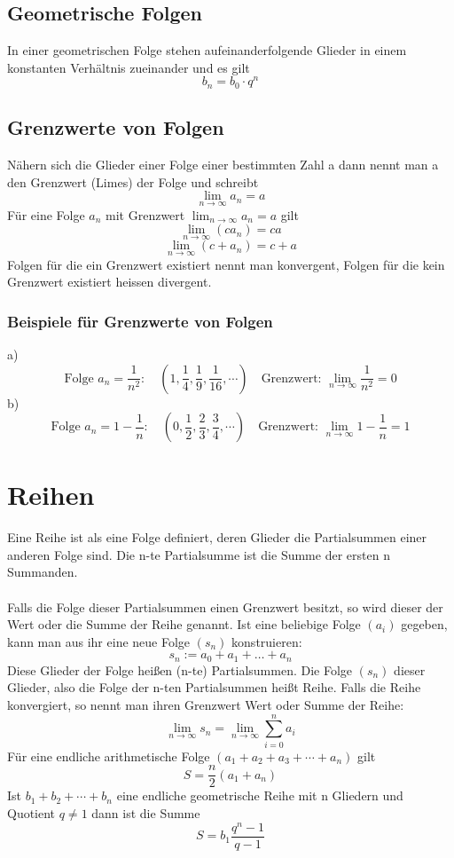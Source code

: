 \documentclass[a4paper]{article}
\begin{document}
\subsection{Geometrische Folgen}
In einer geometrischen Folge stehen aufeinanderfolgende Glieder in einem konstanten Verhältnis zueinander und es gilt
\[ b_n=b_0 \cdot q^n \]

\subsection{Grenzwerte von Folgen}
Nähern sich die Glieder einer Folge einer bestimmten Zahl a dann nennt man a den Grenzwert (Limes) der Folge und schreibt
\[ \lim_{n \to \infty} a_n=a \]
Für eine Folge  $a_n$ mit Grenzwert $\lim_{n \to \infty} a_n=a$ gilt
\[ \lim_{n \to \infty} (ca_n)=ca \]
\[ \lim_{n \to \infty} (c+a_n)=c+a \]
Folgen für die ein Grenzwert existiert nennt man konvergent, Folgen für die kein Grenzwert existiert heissen divergent.

\subsubsection{Beispiele für Grenzwerte von Folgen}
a) \[ \text{Folge } a_n=\frac{1}{n^2}: \quad \left(1,\frac{1}{4}, \frac{1}{9}, \frac{1}{16}, \cdots \right) \quad \text{Grenzwert: } \lim_{n \to \infty} \frac{1}{n^2}=0 \]
b) \[ \text{Folge } a_n=1-\frac{1}{n}: \quad \left(0, \frac{1}{2}, \frac{2}{3}, \frac{3}{4}, \cdots \right) \quad \text{Grenzwert: } \lim_{n \to \infty} 1- \frac{1}{n}=1 \]

\section{Reihen}
Eine Reihe ist als eine Folge definiert, deren Glieder die Partialsummen einer anderen Folge sind. Die n-te Partialsumme ist die Summe der ersten n  Summanden. \\\\
Falls die Folge dieser Partialsummen einen Grenzwert besitzt, so wird dieser der Wert oder die Summe der Reihe genannt.
Ist eine beliebige Folge $(a_i)$ gegeben, kann man aus ihr eine neue Folge $\left(s_n\right)$ konstruieren:
\[ s_n := a_0 + a_1 + \ldots + a_n \]
Diese Glieder der Folge heißen (n-te) Partialsummen. Die Folge $\left(s_n\right)$ dieser Glieder, also die Folge der n-ten Partialsummen heißt Reihe. Falls die Reihe konvergiert, so nennt man ihren Grenzwert Wert oder Summe der Reihe:
\[ \lim_{n \to \infty} s_n = \lim_{n \to \infty} \sum_{i=0}^n a_i \] 
Für eine endliche arithmetische Folge $(a_1+a_2+a_3+\cdots+a_n)$ gilt
\[ S=\frac{n}{2}(a_1+a_n) \]
Ist $b_1+b_2+\cdots+b_n$ eine endliche geometrische Reihe mit n Gliedern und Quotient $q \neq 1$ dann ist die Summe
\[ S=b_1 \frac{q^n-1}{q-1} \]
\end{document}

